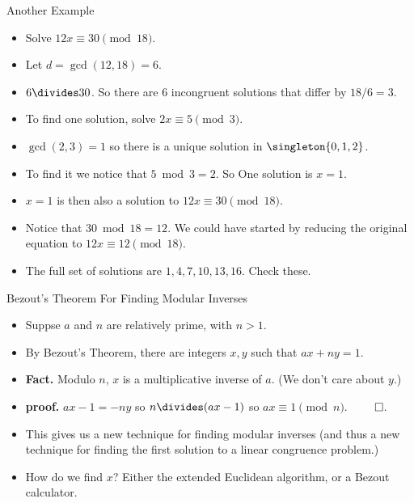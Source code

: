 \documentclass{beamer}
\begin{document}
\begin{frame}{Another Example}
\begin{itemize}
  \item Solve $12x \equiv 30 \pmod {18}$.
  \item Let $d=\gcd(12,18) = 6$.
  \item $6\divides 30$. So there are 6 incongruent solutions that differ by $18/6=3$.
  \item To find one solution, solve $2x \equiv 5 \pmod 3$.
  \item $\gcd(2,3) = 1$ so there is a unique solution in $\singleton{0,1,2}$.
  \item To find it we notice that $5\bmod3 = 2$. So One solution is $x=1$.
  \item $x=1$ is then also a solution to $12x \equiv 30 \pmod {18}$.
  \item Notice that $30\bmod 18 = 12$. We could have started by reducing the original equation to $12x \equiv 12 \pmod {18}$.
  \item The full set of solutions are $1,4,7,10,13,16$. Check these.
\end{itemize}
\end{frame}

\begin{frame}{Bezout's Theorem For Finding Modular Inverses}
\begin{itemize}
  \item Suppse $a$ and $n$ are relatively prime, with $n>1$.
  \item By Bezout's Theorem, there are integers $x,y$ such that $ax+ny = 1$.
  \item \textbf{Fact.} Modulo $n$, $x$ is a multiplicative inverse of $a$. (We don't care about $y$.)
  \item \textbf{proof.} $ax -1 = -ny$ so $n\divides (ax-1)$ so $ax \equiv 1 \pmod n$. $\qed$.
  \item This gives us a new technique for finding modular inverses
  (and thus a new technique for finding the first solution to a linear congruence problem.)
  \item How do we find $x$? Either the extended Euclidean algorithm, or a Bezout calculator.
\end{itemize}
\end{frame}
\end{document}
